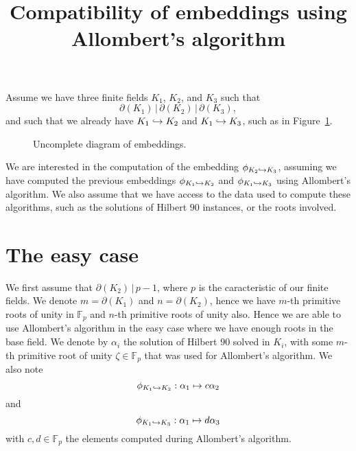 \documentclass[a4paper,11pt]{article}
\title{Compatibility of embeddings using Allombert's algorithm}
\author{}
\begin{document}
\maketitle





Assume we have three finite fields $K_1$, $K_2$, and $K_3$ such that
\[\partial(K_1)\,|\,\partial(K_2)\,|\,\partial(K_3),\]
and such that we already have $K_1\hookrightarrow K_2$ and $K_1\hookrightarrow K_3$, \ie such as in
Figure~\ref{fig:uncomplete}.
\begin{figure}
  \centering

  \caption{Uncomplete diagram of embeddings.}
  \label{fig:uncomplete}
\end{figure}
We are interested in the computation of the embedding $\phi_{K_2\hookrightarrow K_3}$,
assuming we have computed the previous embeddings $\phi_{K_1\hookrightarrow K_2}$ and
$\phi_{K_1\hookrightarrow K_3}$ using Allombert's algorithm. We also assume that we have access
to the data used to compute these algorithms, such as the solutions of Hilbert
$90$ instances, or the roots involved.

\section{The easy case}

We first assume that $\partial(K_2)\,|\,p-1$, where $p$ is the caracteristic of
our finite fields. We denote $m=\partial(K_1)$ and $n=\partial(K_2)$, hence we
have $m$-th primitive roots of unity in $\mathbb{F}_p$ and $n$-th primitive
roots of unity also. Hence we are able to use Allombert's algorithm in the easy
case where we have enough roots in the base field. We denote by $\alpha_i$ the
solution of Hilbert $90$ solved in $K_i$, with some $m$-th primitive root of
unity $\zeta\in\mathbb{F}_p$ that was used for Allombert's algorithm. We also
note 
\[\phi_{K_1\hookrightarrow K_2}:\alpha_1\mapsto c\alpha_2
\]
and
\[\phi_{K_1\hookrightarrow K_3}:\alpha_1\mapsto d\alpha_3
\]
with $c, d\in\mathbb{F}_p$ the
elements computed during Allombert's algorithm.
\end{document}
